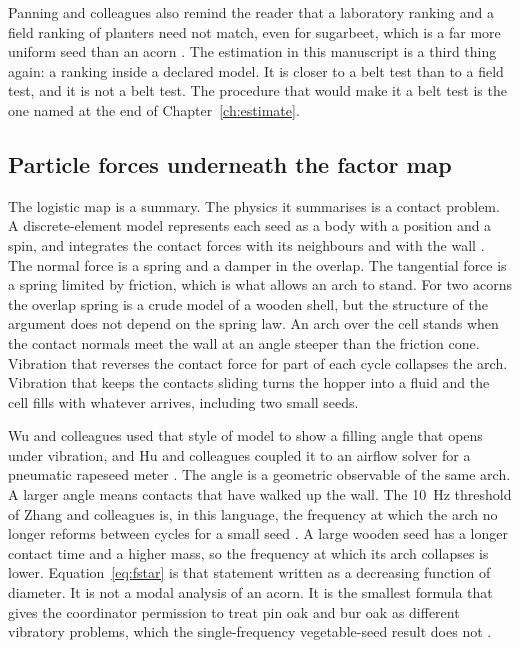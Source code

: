 Panning and colleagues also remind the reader that a laboratory ranking and a field ranking of planters need not match, even for sugarbeet, which is a far more uniform seed than an acorn \cite{panning2000}. The estimation in this manuscript is a third thing again: a ranking inside a declared model. It is closer to a belt test than to a field test, and it is not a belt test. The procedure that would make it a belt test is the one named at the end of Chapter~\ref{ch:estimate}.

\subsection{Particle forces underneath the factor map}

The logistic map is a summary. The physics it summarises is a contact problem. A discrete-element model represents each seed as a body with a position and a spin, and integrates the contact forces with its neighbours and with the wall \cite{cundall1979}. The normal force is a spring and a damper in the overlap. The tangential force is a spring limited by friction, which is what allows an arch to stand. For two acorns the overlap spring is a crude model of a wooden shell, but the structure of the argument does not depend on the spring law. An arch over the cell stands when the contact normals meet the wall at an angle steeper than the friction cone. Vibration that reverses the contact force for part of each cycle collapses the arch. Vibration that keeps the contacts sliding turns the hopper into a fluid and the cell fills with whatever arrives, including two small seeds.

Wu and colleagues used that style of model to show a filling angle that opens under vibration, and Hu and colleagues coupled it to an airflow solver for a pneumatic rapeseed meter \cite{wu2022,hu2021,lei2021}. The angle is a geometric observable of the same arch. A larger angle means contacts that have walked up the wall. The 10~Hz threshold of Zhang and colleagues is, in this language, the frequency at which the arch no longer reforms between cycles for a small seed \cite{zhang2024vib}. A large wooden seed has a longer contact time and a higher mass, so the frequency at which its arch collapses is lower. Equation~\eqref{eq:fstar} is that statement written as a decreasing function of diameter. It is not a modal analysis of an acorn. It is the smallest formula that gives the coordinator permission to treat pin oak and bur oak as different vibratory problems, which the single-frequency vegetable-seed result does not \cite{li2025drum}.

